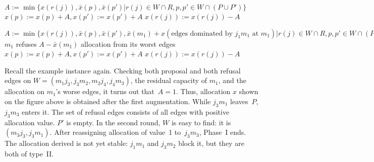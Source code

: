\documentclass{llncs}
\begin{document}
\begin{algorithmic}[]
		\State $A := \min\{x(r(j)), \bar{x}(p), \bar{x}(p')| r(j) \in W \cap R, p, p' \in W \cap (P  \cup P')\}$
			\State $x(p) := x(p) + A, x(p') := x(p') + A$
		\EndFor
			\State $x(r(j)) := x(r(j)) - A$
		\EndFor
	\EndProcedure
\end{algorithmic}
\vline

\begin{algorithmic}[]
		\State $A := \min \{x(r(j)), \bar{x}(p), \bar{x}(p'), \bar{x}(m_1) + x(\text{edges dominated by }j_1 m_1 \text{ at }m_1) | r(j) \in W \cap R, p, p' \in W \cap (P  \cup P')\}$
			\State $m_1$ refuses $A - \bar{x}(m_1)$ allocation from its worst edges
		\EndIf
			\State $x(p) := x(p) + A, x(p') := x(p') + A$
		\EndFor
			\State $x(r(j)) := x(r(j)) - A$
		\EndFor		
	\EndProcedure
\end{algorithmic}

Recall the example instance again. Checking both proposal and both refusal edges on $W = (m_1 j_3, j_3 m_2, m_2j_4, j_4m_3)$, the residual capacity of $m_1$, and the allocation on $m_1$'s worse edges, it turns out that~$A = 1$. Thus, allocation $x$ shown on the figure above is obtained after the first augmentation. While $j_3m_1$ leaves~$P$, $j_3m_3$ enters it. The set of refusal edges consists of all edges with positive allocation value. $P'$ is empty. In the second round, $W$ is easy to find: it is~$(m_3j_3, j_3m_1)$. After reassigning allocation of value~1 to~$j_3m_3$, Phase~I ends. The allocation derived is not yet stable: $j_1m_1$ and $j_3m_2$ block it, but they are both of type~II. 
\end{document}
